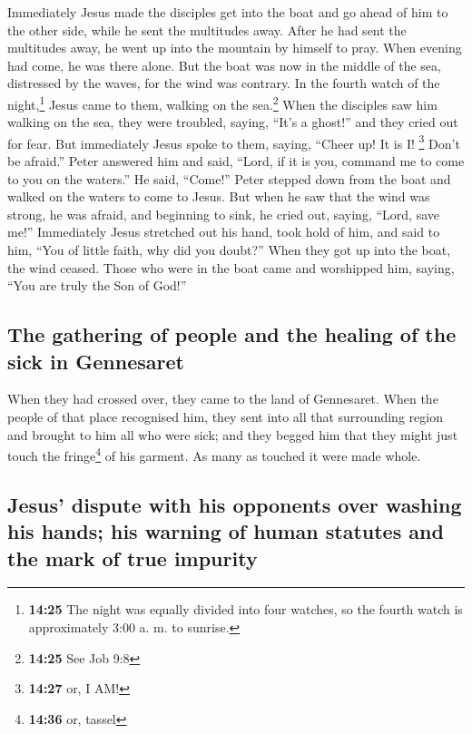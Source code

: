  Immediately Jesus made the disciples get into the boat
and go ahead of him to the other side, while he sent the multitudes
away.  After he had sent the multitudes away, he went up
into the mountain by himself to pray. When evening had come, he was
there alone.  But the boat was now in the middle of the
sea, distressed by the waves, for the wind was contrary. 
In the fourth watch of the night,\footnote{\textbf{14:25} The night was
  equally divided into four watches, so the fourth watch is
  approximately 3:00 a. m. to sunrise.} Jesus came to them, walking on
the sea.\footnote{\textbf{14:25} See Job 9:8}  When the
disciples saw him walking on the sea, they were troubled, saying, ``It's
a ghost!'' and they cried out for fear.  But immediately
Jesus spoke to them, saying, ``Cheer up! It is I! \footnote{\textbf{14:27}
  or, I AM!} Don't be afraid.''  Peter answered him and
said, ``Lord, if it is you, command me to come to you on the waters.''
 He said, ``Come!'' Peter stepped down from the boat and
walked on the waters to come to Jesus.  But when he saw
that the wind was strong, he was afraid, and beginning to sink, he cried
out, saying, ``Lord, save me!''  Immediately Jesus
stretched out his hand, took hold of him, and said to him, ``You of
little faith, why did you doubt?''  When they got up into
the boat, the wind ceased.  Those who were in the boat
came and worshipped him, saying, ``You are truly the Son of God!''

\hypertarget{the-gathering-of-people-and-the-healing-of-the-sick-in-gennesaret}{%
\subsection{The gathering of people and the healing of the sick in
Gennesaret}\label{the-gathering-of-people-and-the-healing-of-the-sick-in-gennesaret}}

 When they had crossed over, they came to the land of
Gennesaret.  When the people of that place recognised
him, they sent into all that surrounding region and brought to him all
who were sick;  and they begged him that they might just
touch the fringe\footnote{\textbf{14:36} or, tassel} of his garment. As
many as touched it were made whole.

\hypertarget{jesus-dispute-with-his-opponents-over-washing-his-hands-his-warning-of-human-statutes-and-the-mark-of-true-impurity}{%
\subsection{Jesus' dispute with his opponents over washing his hands;
his warning of human statutes and the mark of true
impurity}\label{jesus-dispute-with-his-opponents-over-washing-his-hands-his-warning-of-human-statutes-and-the-mark-of-true-impurity}}


